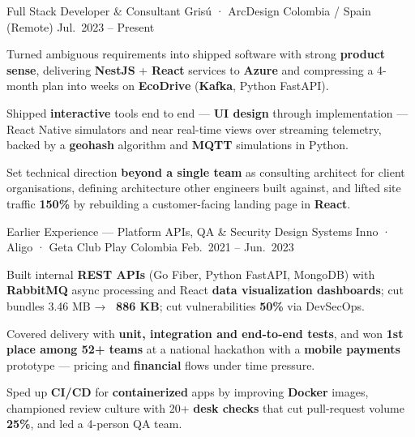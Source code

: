 \begin{cventries}
  \cventry
  {Full Stack Developer \& Consultant}
  {Grisú · ArcDesign}
  {Colombia / Spain (Remote)}
  {Jul.\ 2023 -- Present}
  {
    \begin{cvitems}
      \item {Turned ambiguous requirements into shipped software with strong \textbf{product sense}, delivering \textbf{NestJS} + \textbf{React} services to \textbf{Azure} and compressing a 4-month plan into weeks on \textbf{EcoDrive} (\textbf{Kafka}, Python FastAPI).}
      \item {Shipped \textbf{interactive} tools end to end --- \textbf{UI design} through implementation --- React Native simulators and near real-time views over streaming telemetry, backed by a \textbf{geohash} algorithm and \textbf{MQTT} simulations in Python.}
      \item {Set technical direction \textbf{beyond a single team} as consulting architect for client organisations, defining architecture other engineers built against, and lifted site traffic \textbf{150\%} by rebuilding a customer-facing landing page in \textbf{React}.}
    \end{cvitems}
  }

  \cventry
  {Earlier Experience --- Platform APIs, QA \& Security}
  {Design Systems Inno · Aligo · Geta Club Play}
  {Colombia}
  {Feb.\ 2021 -- Jun.\ 2023}
  {
    \begin{cvitems}
      \item {Built internal \textbf{REST APIs} (Go Fiber, Python FastAPI, MongoDB) with \textbf{RabbitMQ} async processing and React \textbf{data visualization dashboards}; cut bundles 3.46 MB → \textbf{~886 KB}; cut vulnerabilities \textbf{50\%} via DevSecOps.}
      \item {Covered delivery with \textbf{unit, integration and end-to-end tests}, and won \textbf{1st place among 52+ teams} at a national hackathon with a \textbf{mobile payments} prototype --- pricing and \textbf{financial} flows under time pressure.}
      \item {Sped up \textbf{CI/CD} for \mbox{\textbf{containerized}} apps by improving \textbf{Docker} images, championed review culture with 20+ \textbf{desk checks} that cut pull-request volume \textbf{25\%}, and led a 4-person QA team.}
    \end{cvitems}
  }

\end{cventries}
